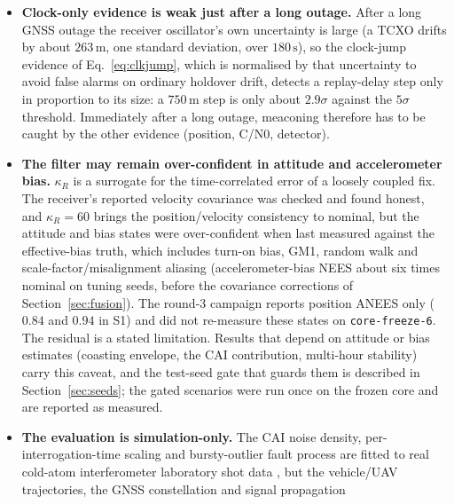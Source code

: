 \documentclass[journal]{IEEEtran}
\begin{document}
\begin{itemize}
  whereas the tighter tactical-grade bound rejects far smaller offsets. Once admitted, the damage per epoch is
  bounded by the coasting covariance, not unbounded. The detection-power figures that motivated the calibration
  were obtained on tuning seeds and are diagnostics, not findings. The same limit applies to the
  consistency-based waiver of the reacquisition cap. The detection power of the probe against offset spoofs was not measured separately on the test seeds.
\item \textbf{Clock-only evidence is weak just after a long outage.} After a long GNSS outage the receiver
  oscillator's own uncertainty is large (a TCXO drifts by about $263\,\mathrm{m}$, one standard deviation, over
  $180\,\mathrm{s}$), so the clock-jump evidence of Eq.~\eqref{eq:clkjump}, which is normalised by that
  uncertainty to avoid false alarms on ordinary holdover drift, detects a replay-delay step only in proportion
  to its size: a $750\,\mathrm{m}$ step is only about $2.9\sigma$ against the $5\sigma$ threshold. Immediately
  after a long outage, meaconing therefore has to be caught by the other evidence (position, C/N0, detector).
\item \textbf{The filter may remain over-confident in attitude and accelerometer bias.} $\kappa_R$ is a surrogate
  for the time-correlated error of a loosely coupled fix. The receiver's reported velocity covariance was
  checked and found honest, and $\kappa_R = 60$ brings the position/velocity consistency to nominal, but the
  attitude and bias states were over-confident when last measured against the effective-bias truth, which includes turn-on bias,
  GM1, random walk and scale-factor/misalignment aliasing (accelerometer-bias NEES about six times
  nominal on tuning seeds, before the covariance corrections of Section~\ref{sec:fusion}). The round-3 campaign reports position ANEES only ($0.84$ and $0.94$ in S1) and did not re-measure these states on \texttt{core-freeze-6}.
  The residual is a stated limitation. Results that depend on attitude or
  bias estimates (coasting envelope, the CAI contribution, multi-hour stability) carry this caveat, and the
  test-seed gate that guards them is described in Section~\ref{sec:seeds}; the gated scenarios were run once on the frozen core and are reported as measured.
\item \textbf{The evaluation is simulation-only.} The CAI noise density, per-interrogation-time scaling and
  bursty-outlier fault process are fitted to real cold-atom interferometer laboratory shot data
  \cite{darmagnac2024atom}, but the vehicle/UAV trajectories, the GNSS constellation and signal propagation

\end{itemize}
\end{document}
